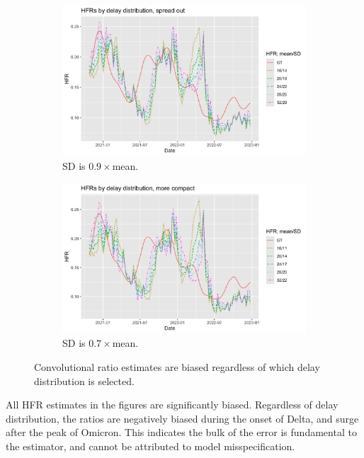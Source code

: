\documentclass{article}
\begin{document}
\begin{figure}
     \centering
     \begin{subfigure}[b]{0.45\linewidth}
         \centering
         \includegraphics[width=\linewidth]{Figs/hfrs_by_delay1.png}
         \caption{SD is $0.9\times$mean.}
         \label{fig:delay1}
     \end{subfigure}
     \hfill
     \begin{subfigure}[b]{0.45\linewidth}
         \centering
         \includegraphics[width=\linewidth]{Figs/hfrs_by_delay2.png}
         \caption{SD is $0.7\times$mean.}
         \label{fig:delay2}
     \end{subfigure}
        \caption{Convolutional ratio estimates are biased regardless of which delay distribution is selected.}
        \label{fig:delays}
\end{figure}
All HFR estimates in the figures are significantly biased. Regardless of delay distribution, the ratios are negatively biased during the onset of Delta, and surge after the peak of Omicron. This indicates the bulk of the error is fundamental to the estimator, and cannot be attributed to model misspecification. 
\end{document}
